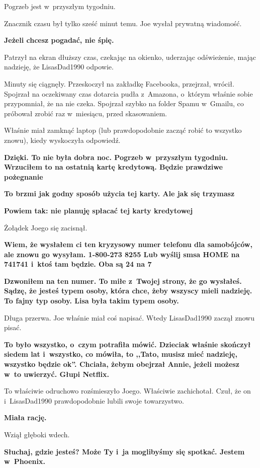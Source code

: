 \documentclass[oneside,polish,11pt,sfheadings]{mwbk}
\begin{document}
Pogrzeb jest w~przyszłym tygodniu.

Znacznik czasu był tylko sześć minut temu. Joe wysłał prywatną
wiadomość.

\textbf{ Jeżeli chcesz pogadać, nie śpię.}

Patrzył na ekran dłuższy czas, czekając na okienko, uderzając
odświeżenie, mając nadzieję, że LisasDad1990 odpowie.

Minuty się ciągnęły. Przeskoczył na zakładkę Facebooka, przejrzał,
wrócił. Spojrzał na oczekiwany czas dotarcia pudła z~Amazona, o~którym
właśnie sobie przypomniał, że na nie czeka. Spojrzał szybko na folder
Spamu w~Gmailu, co próbował zrobić raz w~miesiącu, przed skasowaniem.

Właśnie miał zamknąć laptop (lub prawdopodobnie zacząć robić to wszystko
znowu), kiedy wyskoczyła odpowiedź.

\textbf{ Dzięki. To nie była dobra noc. Pogrzeb w~przyszłym tygodniu. Wrzuciłem to na ostatnią kartę kredytową. Będzie
prawdziwe pożegnanie}

\textbf{ To brzmi jak godny sposób użycia tej karty. Ale
jak się trzymasz}

\textbf{ Powiem tak: nie planuję spłacać tej karty
kredytowej}

Żołądek Joego się zacisnął.

\textbf{ Wiem, że wysłałem ci ten kryzysowy numer telefonu
dla samobójców, ale znowu go wysyłam. 1-800-273 8255 Lub wyślij smsa
HOME na 741741 i~ktoś tam będzie. Oba są 24 na 7}

\textbf{ Dzwoniłem na ten numer. To miłe z~Twojej strony,
że go wysłałeś. Sądzę, że jesteś typem osoby, która chce, żeby wszyscy
mieli nadzieję. To fajny typ osoby. Lisa była takim typem osoby.}

Długa przerwa. Joe właśnie miał coś napisać. Wtedy LisasDad1990 zaczął
znowu pisać.

\textbf{ To było wszystko, o~czym potrafiła mówić.
Dzieciak właśnie skończył siedem lat i~wszystko, co mówiła, to ,,Tato,
musisz mieć nadzieję, wszystko będzie ok''. Chciała, żebym obejrzał
Annie, jeżeli możesz w~to uwierzyć. Głupi Netflix.}

To właściwie odruchowo rozśmieszyło Joego. Właściwie zachichotał. Czuł,
że on i~LisasDad1990 prawdopodobnie lubili swoje towarzystwo.

\textbf{ Miała rację.}

Wziął głęboki wdech.

\textbf{ Słuchaj, gdzie jesteś? Może Ty i~ja moglibyśmy
się spotkać. Jestem w~Phoenix.}
\end{document}

